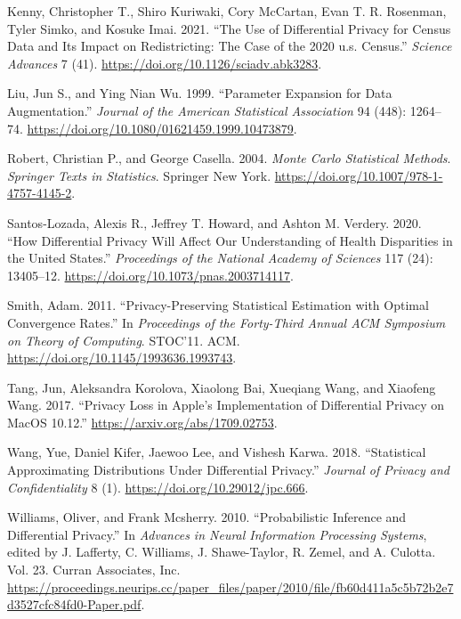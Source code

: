 \begin{CSLReferences}{1}{0}
\leavevmode{}%
Kenny, Christopher T., Shiro Kuriwaki, Cory McCartan, Evan T. R. Rosenman, Tyler Simko, and Kosuke Imai. 2021. {``The Use of Differential Privacy for Census Data and Its Impact on Redistricting: The Case of the 2020 u.s. Census.''} \emph{Science Advances} 7 (41). \url{https://doi.org/10.1126/sciadv.abk3283}.

\leavevmode{}%
Liu, Jun S., and Ying Nian Wu. 1999. {``Parameter Expansion for Data Augmentation.''} \emph{Journal of the American Statistical Association} 94 (448): 1264--74. \url{https://doi.org/10.1080/01621459.1999.10473879}.

\leavevmode{}%
Robert, Christian P., and George Casella. 2004. \emph{Monte Carlo Statistical Methods}. \emph{Springer Texts in Statistics}. Springer New York. \url{https://doi.org/10.1007/978-1-4757-4145-2}.

\leavevmode{}%
Santos-Lozada, Alexis R., Jeffrey T. Howard, and Ashton M. Verdery. 2020. {``How Differential Privacy Will Affect Our Understanding of Health Disparities in the United States.''} \emph{Proceedings of the National Academy of Sciences} 117 (24): 13405--12. \url{https://doi.org/10.1073/pnas.2003714117}.

\leavevmode{}%
Smith, Adam. 2011. {``Privacy-Preserving Statistical Estimation with Optimal Convergence Rates.''} In \emph{Proceedings of the Forty-Third Annual ACM Symposium on Theory of Computing}. STOC'11. ACM. \url{https://doi.org/10.1145/1993636.1993743}.

\leavevmode{}%
Tang, Jun, Aleksandra Korolova, Xiaolong Bai, Xueqiang Wang, and Xiaofeng Wang. 2017. {``Privacy Loss in Apple's Implementation of Differential Privacy on MacOS 10.12.''} \url{https://arxiv.org/abs/1709.02753}.

\leavevmode{}%
Wang, Yue, Daniel Kifer, Jaewoo Lee, and Vishesh Karwa. 2018. {``Statistical Approximating Distributions Under Differential Privacy.''} \emph{Journal of Privacy and Confidentiality} 8 (1). \url{https://doi.org/10.29012/jpc.666}.

\leavevmode{}%
Williams, Oliver, and Frank Mcsherry. 2010. {``Probabilistic Inference and Differential Privacy.''} In \emph{Advances in Neural Information Processing Systems}, edited by J. Lafferty, C. Williams, J. Shawe-Taylor, R. Zemel, and A. Culotta. Vol. 23. Curran Associates, Inc. \url{https://proceedings.neurips.cc/paper_files/paper/2010/file/fb60d411a5c5b72b2e7d3527cfc84fd0-Paper.pdf}.


\end{CSLReferences}
